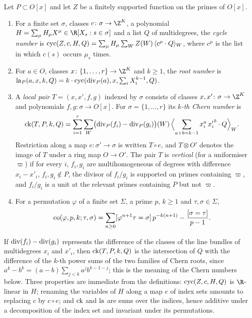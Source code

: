 \begin{definition}\label{pf:towergeo:def-numbers}
Let $P\subset O[x]$ and let $Z$ be a finitely supported function on the primes of $O[x]$.
\begin{enumerate}[label=(\alph*)]
\item For a finite set $\sigma$, classes $c\colon\sigma\to\Z^K$, a polynomial
  $H=\sum_\mu H_\mu X^\mu\in\R[X_s:s\in\sigma]$ and a list $Q$ of multidegrees, the \emph{cycle number}
  is $\operatorname{cyc}(Z,c,H,Q)=\sum_\mu H_\mu\sum_WZ(W)\,\langle c^\mu\cdot Q\rangle_W$, where $c^\mu$ is the
  list in which $c(s)$ occurs $\mu_s$ times.
\item For $a\in O$, classes $x\colon\{1,\dots,r\}\to\Z^K$ and $k\ge1$, the \emph{root number} is
  $\operatorname{la}_P(a,x,k,Q)=k\cdot\operatorname{cyc}(\operatorname{div}_P(a),x,\sum_iX_i^{k-1},Q)$.
\item A \emph{local pair} $T=(x,x',f,g)$ indexed by $\sigma$ consists of classes
  $x,x'\colon\sigma\to\Z^K$ and polynomials $f,g\colon\sigma\to O[x]$. For $\sigma=\{1,\dots,r\}$ its
  \emph{$k$-th Chern number} is
  \[
  \operatorname{ck}(T,P,k,Q)=\sum_{i=1}^r\sum_W\bigl(\operatorname{div}_P(f_i)-\operatorname{div}_P(g_i)\bigr)(W)\,
  \Bigl\langle\sum_{a+b=k-1}x_i^a\,{x'_i}^b\cdot Q\Bigr\rangle_W .
  \]
  Restriction along a map $e\colon\sigma'\to\sigma$ is written $T\circ e$, and $T\otimes O'$ denotes the
  image of $T$ under a ring map $O\to O'$. The pair $T$ is \emph{vertical} (for a uniformiser $\varpi$) if
  for every $i$, $f_i,g_i$ are multihomogeneous of degrees with difference $x_i-x'_i$, $f_i,g_i\notin P$,
  the divisor of $f_i/g_i$ is supported on primes containing $\varpi$, and $f_i/g_i$ is a unit at the
  relevant primes containing $P$ but not $\varpi$.
\item For a permutation $\varphi$ of a finite set $\Sigma$, a prime $p$, $k\ge1$ and
  $\tau,\sigma\in\Sigma$,
  \[
  \operatorname{co}(\varphi,p,k;\tau,\sigma)=\sum_{n\ge0}[\varphi^{n+1}\tau=\sigma]\,p^{-k(n+1)}
  -\frac{[\sigma=\tau]}{p-1}.
  \]
\end{enumerate}
\end{definition}

If $\operatorname{div}(f_i)-\operatorname{div}(g_i)$ represents the difference of the classes of the line bundles of
multidegrees $x_i$ and $x'_i$, then $\operatorname{ck}(T,P,k,Q)$ is the intersection of $Q$ with the difference
of the $k$-th power sums of the two families of Chern roots, since $a^k-b^k=(a-b)\sum_{j<k}a^jb^{k-1-j}$;
this is the meaning of the Chern numbers below. Three properties are immediate from the definitions:
$\operatorname{cyc}(Z,c,H,Q)$ is $\R$-linear in $H$; renaming the variables of $H$ along a map $e$ of index sets
amounts to replacing $c$ by $c\circ e$; and $\operatorname{ck}$ and $\operatorname{la}$ are sums over the indices,
hence additive under a decomposition of the index set and invariant under its permutations.

